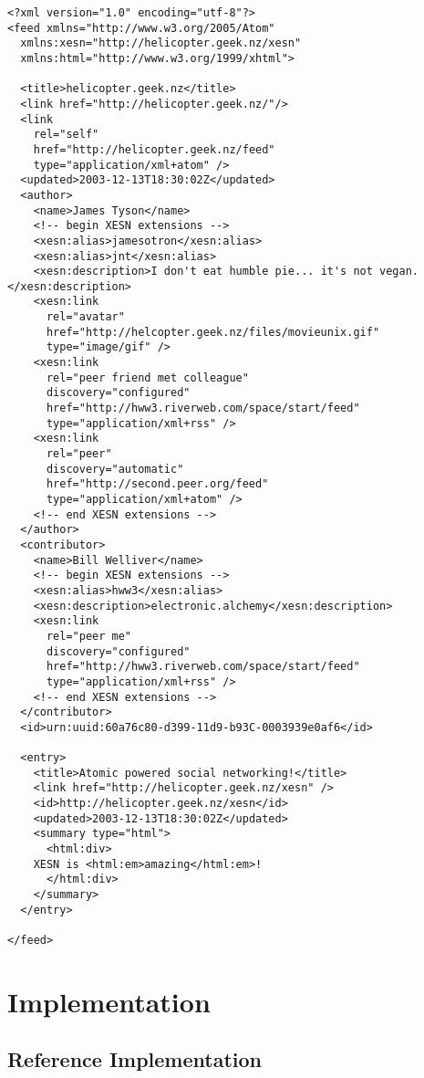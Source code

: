 \documentclass[titlepage,english,a4paper,twoside,dvips]{article}
\begin{document}
\begin{verbatim}
<?xml version="1.0" encoding="utf-8"?>
<feed xmlns="http://www.w3.org/2005/Atom" 
  xmlns:xesn="http://helicopter.geek.nz/xesn"
  xmlns:html="http://www.w3.org/1999/xhtml">

  <title>helicopter.geek.nz</title>
  <link href="http://helicopter.geek.nz/"/>
  <link 
    rel="self" 
    href="http://helicopter.geek.nz/feed" 
    type="application/xml+atom" />
  <updated>2003-12-13T18:30:02Z</updated>
  <author>
    <name>James Tyson</name>
    <!-- begin XESN extensions -->
    <xesn:alias>jamesotron</xesn:alias>
    <xesn:alias>jnt</xesn:alias>
    <xesn:description>I don't eat humble pie... it's not vegan.</xesn:description>
    <xesn:link
      rel="avatar"
      href="http://helcopter.geek.nz/files/movieunix.gif"
      type="image/gif" />
    <xesn:link 
      rel="peer friend met colleague"
      discovery="configured"
      href="http://hww3.riverweb.com/space/start/feed"
      type="application/xml+rss" />
    <xesn:link 
      rel="peer"
      discovery="automatic"
      href="http://second.peer.org/feed" 
      type="application/xml+atom" />
    <!-- end XESN extensions -->
  </author>
  <contributor>
    <name>Bill Welliver</name>
    <!-- begin XESN extensions -->
    <xesn:alias>hww3</xesn:alias>
    <xesn:description>electronic.alchemy</xesn:description>
    <xesn:link 
      rel="peer me"
      discovery="configured"
      href="http://hww3.riverweb.com/space/start/feed"
      type="application/xml+rss" />
    <!-- end XESN extensions -->
  </contributor>
  <id>urn:uuid:60a76c80-d399-11d9-b93C-0003939e0af6</id>

  <entry>
    <title>Atomic powered social networking!</title>
    <link href="http://helicopter.geek.nz/xesn" />
    <id>http://helicopter.geek.nz/xesn</id>
    <updated>2003-12-13T18:30:02Z</updated>
    <summary type="html">
      <html:div>
	XESN is <html:em>amazing</html:em>!
      </html:div>
    </summary>
  </entry>

</feed>
\end{verbatim}

\clearpage

\section{Implementation}

\subsection{Reference Implementation}
\end{document}
